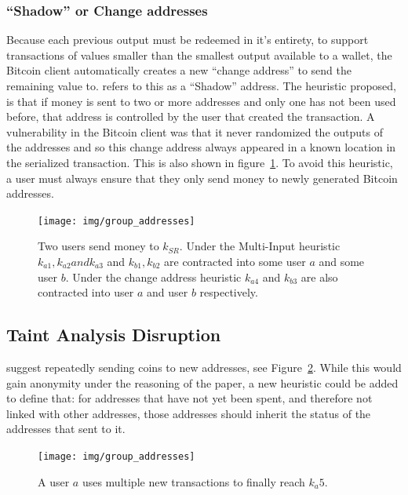 \subsubsection{``Shadow'' or Change addresses}
Because each previous output must be redeemed in it's entirety, to support transactions of values smaller than the smallest output available to a wallet, the Bitcoin client automatically creates a new ``change address'' to send the remaining value to.  \cite{eval-priv} refers to this as a ``Shadow'' address.  The heuristic proposed, is that if money is sent to two or more addresses and only one has not been used before, that address is controlled by the user that created the transaction. A vulnerability in the Bitcoin client was that it never randomized the outputs of the addresses and so this change address always appeared in a known location in the serialized transaction\cite{cve-ordered-trans}. This is also shown in figure~\ref{fig:multi-spend}. To avoid this heuristic, a user must always ensure that they only send money to newly generated Bitcoin addresses.

\begin{figure}[t!]
    \centering
    \texttt{[image: img/group\_addresses]}
     \caption{Two users send money to $k_{SR}$. Under the Multi-Input  heuristic $k_{a1}, k_{a2} and k_{a3}$ and $k_{b1}, k_{b2}$ are contracted into  some user $a$ and some user $b$. Under the change address heuristic  $k_{a4}$ and $k_{b3}$ are also contracted into user $a$ and user $b$  respectively. }
    \label{fig:multi-spend}
\end{figure}

\subsection{Taint Analysis Disruption}
\textcite{reid-anon} suggest repeatedly sending coins to new addresses, see Figure~\ref{fig:multi-new-addresses}. While this would gain anonymity under the reasoning of the paper, a new heuristic could be added to define that: for addresses that have not yet been spent, and therefore not linked with other addresses, those addresses should inherit the status of the addresses that sent to it.

\begin{figure}[t!]
    \centering
    \texttt{[image: img/group\_addresses]}
      \caption{A user $a$ uses multiple new transactions to finally reach $k_a5$. }
    \label{fig:multi-new-addresses}
\end{figure}

